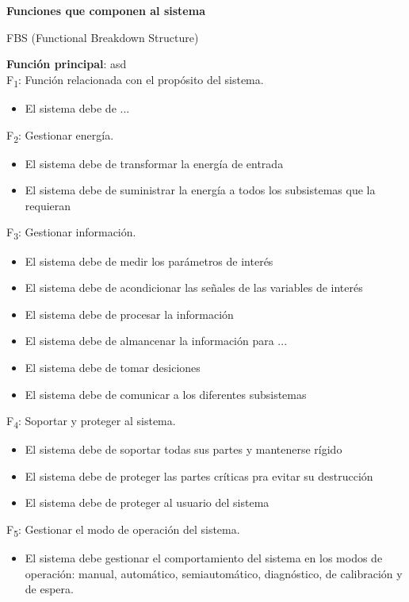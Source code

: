 \textbf{{\large Funciones que componen al sistema}}

FBS (Functional Breakdown Structure)

\textbf{Función principal}: asd\\

F\textsubscript{1}: Función relacionada con el propósito del sistema. 
\begin{itemize}
	\item El sistema debe de ...
\end{itemize}

F\textsubscript{2}: Gestionar energía. 
\begin{itemize}
	\item El sistema debe de transformar la energía de entrada 
	\item El sistema debe de suministrar la energía a todos los subsistemas que la requieran
\end{itemize}

F\textsubscript{3}: Gestionar información. 
\begin{itemize}
	\item El sistema debe de medir los parámetros de interés
	\item El sistema debe de acondicionar las señales de las variables de interés
	\item El sistema debe de procesar la información
	\item El sistema debe de almancenar la información para ...
	\item El sistema debe de tomar desiciones
	\item El sistema debe de comunicar a los diferentes subsistemas
\end{itemize}

F\textsubscript{4}: Soportar y proteger al sistema. 
\begin{itemize}
	\item El sistema debe de soportar todas sus partes y mantenerse rígido %
	\item El sistema debe de proteger las partes críticas pra evitar su destrucción
	\item El sistema debe de proteger al usuario del sistema %
\end{itemize}

F\textsubscript{5}: Gestionar el modo de operación del sistema. 
\begin{itemize}
	\item El sistema debe gestionar el comportamiento del sistema en los modos de operación: manual,
	automático, semiautomático, diagnóstico, de calibración y de espera. %
\end{itemize}

